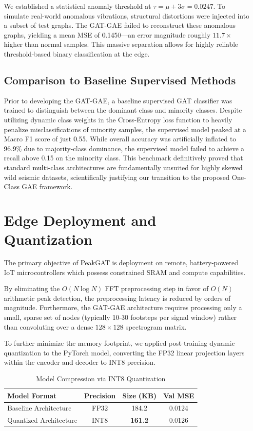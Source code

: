 \documentclass[conference, a4paper]{IEEEtran}
\begin{document}
We established a statistical anomaly threshold at $\tau = \mu + 3\sigma = 0.0247$. To simulate real-world anomalous vibrations, structural distortions were injected into a subset of test graphs. The GAT-GAE failed to reconstruct these anomalous graphs, yielding a mean MSE of 0.1450—an error magnitude roughly $11.7\times$ higher than normal samples. This massive separation allows for highly reliable threshold-based binary classification at the edge.

\subsection{Comparison to Baseline Supervised Methods}
Prior to developing the GAT-GAE, a baseline supervised GAT classifier was trained to distinguish between the dominant class and minority classes. Despite utilizing dynamic class weights in the Cross-Entropy loss function to heavily penalize misclassifications of minority samples, the supervised model peaked at a Macro F1 score of just 0.55. While overall accuracy was artificially inflated to 96.9\% due to majority-class dominance, the supervised model failed to achieve a recall above 0.15 on the minority class. This benchmark definitively proved that standard multi-class architectures are fundamentally unsuited for highly skewed wild seismic datasets, scientifically justifying our transition to the proposed One-Class GAE framework.

\section{Edge Deployment and Quantization}
The primary objective of PeakGAT is deployment on remote, battery-powered IoT microcontrollers which possess constrained SRAM and compute capabilities. 

By eliminating the $O(N \log N)$ FFT preprocessing step in favor of $O(N)$ arithmetic peak detection, the preprocessing latency is reduced by orders of magnitude. Furthermore, the GAT-GAE architecture requires processing only a small, sparse set of nodes (typically 10-30 footsteps per signal window) rather than convoluting over a dense $128 \times 128$ spectrogram matrix.

To further minimize the memory footprint, we applied post-training dynamic quantization to the PyTorch model, converting the FP32 linear projection layers within the encoder and decoder to INT8 precision.

\begin{table}[H]
\centering
\caption{Model Compression via INT8 Quantization}
\label{tab:quantization}
\begin{tabular}{@{}lccc@{}}
\toprule
\textbf{Model Format} & \textbf{Precision} & \textbf{Size (KB)} & \textbf{Val MSE} \\ \midrule
Baseline Architecture & FP32 & 184.2 & 0.0124 \\
Quantized Architecture   & INT8 & \textbf{161.2} & 0.0126 \\ \bottomrule
\end{tabular}
\end{table}
\end{document}
